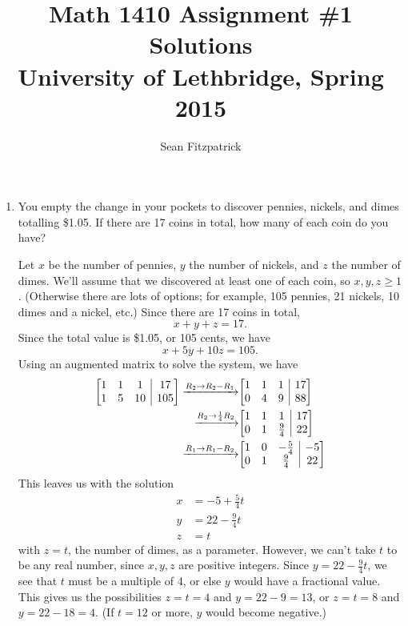 \documentclass[letterpaper,12pt]{article}
\title{Math 1410 Assignment \#1 Solutions\\University of Lethbridge, Spring 2015}
\author{Sean Fitzpatrick}
\makeatletter
\newenvironment{amatrix}[1]{%
  \left[\begin{array}{@{}*{#1}{c}|c@{}}
}{%
  \end{array}\right]
}
\makeatother
\begin{document}
 \maketitle

\begin{enumerate}
 \item You empty the change in your pockets to discover pennies, nickels, and dimes totalling \$1.05. If there are 17 coins in total, how many of each coin do you have?
 
\bigskip

Let $x$ be the number of pennies, $y$ the number of nickels, and $z$ the number of dimes. We'll assume that we discovered at least one of each coin, so $x,y,z\geq 1$. (Otherwise there are lots of options; for example, 105 pennies, 21 nickels, 10 dimes and a nickel, etc.) Since there are 17 coins in total,
\[
 x+y+z=17.
\]
Since the total value is \$1.05, or 105 cents, we have
\[
 x+5y+10z=105.
\]
Using an augmented matrix to solve the system, we have
\begin{align*}
 \begin{amatrix}{3}1&1&1&17\\1&5&10&105\end{amatrix}\xrightarrow[]{R_2\to R_2-R_1}
&\begin{amatrix}{3}1&1&1&17\\0&4&9&88\end{amatrix}\\
\xrightarrow[]{R_2\to \frac{1}{4}R_2}&\begin{amatrix}{3}1&1&1&17\\0&1&\frac{9}{4}&22\end{amatrix}\\
\xrightarrow[]{R_1\to R_1-R_2}&\begin{amatrix}{3}1&0&-\frac{5}{4}&-5\\0&1&\frac{9}{4}&22\end{amatrix}
\end{align*}
This leaves us with the solution
\begin{align*}
 x & = -5 + \frac{5}{4}t\\
 y & = 22 - \frac{9}{4}t\\
 z & = t
\end{align*}
with $z=t$, the number of dimes, as a parameter. However, we can't take $t$ to be any real number, since $x,y,z$ are positive integers. Since $y=22-\frac{9}{4}t$, we see that $t$ must be a multiple of 4, or else $y$ would have a fractional value. This gives us the possibilities $z=t=4$ and $y=22-9=13$, or $z=t=8$ and $y=22-18=4$. (If $t=12$ or more, $y$ would become negative.)


\end{enumerate}
\end{document}
